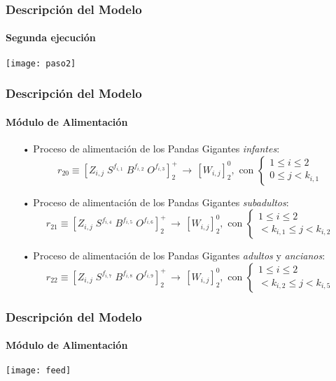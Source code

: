 \documentclass[10pt,a4paper]{beamer}
\theoremstyle{definition}
\theoremstyle{remark}
\begin{document}
\begin{frame}
\frametitle{Descripción del Modelo}
\framesubtitle{Segunda ejecución}
\begin{center}
\texttt{[image: paso2]}
\end{center}
\end{frame}

\begin{frame}
\frametitle{Descripción del Modelo}
\framesubtitle{Módulo de Alimentación}
\begin{small}
\begin{itemize}
\item[•] Proceso de alimentación de los Pandas Gigantes \textit{infantes}:
$$r_{20} \equiv [Z_{i,j} \; S^{f_{i,1}} \; B^{f_{i,2}} \; O^{f_{i,3}}]^+_2 \,\longrightarrow \, [W_{i,j}]^0_2 , \text{ con } \left \{ \begin{matrix} 1 \leq i \leq 2
\\ 0 \leq j < k_{i,1} \end{matrix}\right. $$
\item[•] Proceso de alimentación de los Pandas Gigantes \textit{subadultos}:
$$r_{21} \equiv [Z_{i,j} \; S^{f_{i,4}} \; B^{f_{i,5}} \; O^{f_{i,6}}]^+_2 \,\longrightarrow \, [W_{i,j}]^0_2 , \text{ con } \left \{ \begin{matrix} 1 \leq i \leq 2
\\ < k_{i,1} \leq j < k_{i,2} \end{matrix}\right. $$
\item[•] Proceso de alimentación de los Pandas Gigantes \textit{adultos} y \textit{ancianos}:
$$r_{22} \equiv [Z_{i,j} \; S^{f_{i,7}} \; B^{f_{i,8}} \; O^{f_{i,9}}]^+_2 \,\longrightarrow \, [W_{i,j}]^0_2 , \text{ con } \left \{ \begin{matrix} 1 \leq i \leq 2
\\ < k_{i,2} \leq j < k_{i,5} \end{matrix}\right. $$
\end{itemize}
\end{small}
\end{frame}

\begin{frame}
\frametitle{Descripción del Modelo}
\framesubtitle{Módulo de Alimentación}
\begin{center}
\texttt{[image: feed]}
\end{center}
\end{frame}
\end{document}
